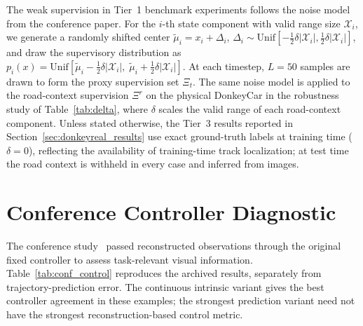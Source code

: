 \documentclass[preprint,12pt]{elsarticle}
\begin{document}
The weak supervision in Tier~1 benchmark experiments follows the noise model from
the conference paper.
For the $i$-th state component with valid range size $\mathcal{X}_i$, we generate a
randomly shifted center $\tilde{\mu}_i = x_i + \Delta_i$,
$\Delta_i \sim \mathrm{Unif}[-\frac{1}{2}\delta|\mathcal{X}_i|,
\frac{1}{2}\delta|\mathcal{X}_i|]$, and draw the supervisory distribution as
$p_i(x) = \mathrm{Unif}[\tilde{\mu}_i - \frac{1}{2}\delta|\mathcal{X}_i|,\;
\tilde{\mu}_i + \frac{1}{2}\delta|\mathcal{X}_i|]$.
At each timestep, $L = 50$ samples are drawn to form the proxy supervision set
$\Xi_t$.
The same noise model is applied to the road-context supervision $\Xi^r$ on the
physical DonkeyCar in the robustness study of Table~\ref{tab:delta}, where
$\delta$ scales the valid range of each road-context component.
Unless stated otherwise, the Tier~3 results reported in
Section~\ref{sec:donkeyreal_results} use exact ground-truth labels at training
time ($\delta = 0$), reflecting the availability of training-time track
localization; at test time the road context is withheld in every case and
inferred from images.


\section{Conference Controller Diagnostic}\label{sec:conf_control}
The conference study~\cite{piwm_conf} passed reconstructed observations through
the original fixed controller to assess task-relevant visual information.
Table~\ref{tab:conf_control} reproduces the archived results, separately from
trajectory-prediction error. The continuous intrinsic variant gives the best
controller agreement in these examples; the strongest prediction variant need
not have the strongest reconstruction-based control metric.
\end{document}
